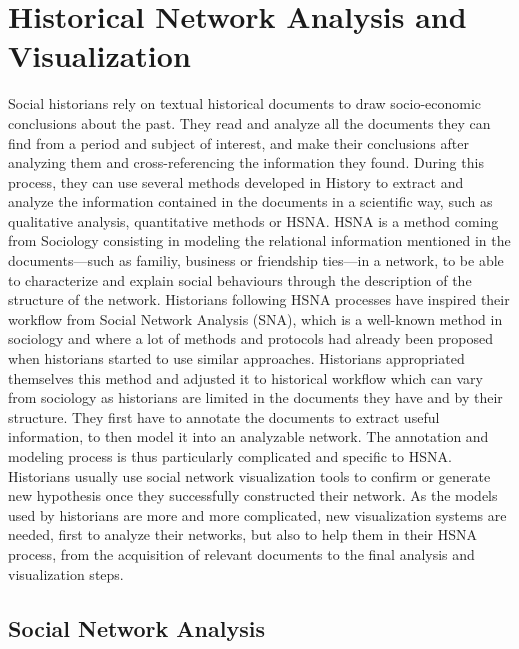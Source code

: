 
\chapter{Historical Network Analysis and Visualization}\label{ch:related-work}

Social historians rely on textual historical documents to draw socio-economic conclusions about the past.
They read and analyze all the documents they can find from a period and subject of interest, and make their conclusions after analyzing them and cross-referencing the information they found.
During this process, they can use several methods developed in History to extract and analyze the information contained in the documents in a scientific way, such as qualitative analysis, quantitative methods or HSNA.
HSNA is a method coming from Sociology consisting in modeling the relational information mentioned in the documents---such as familiy, business or friendship ties---in a network, to be able to characterize and explain social behaviours through the description of the structure of the network.
Historians following HSNA processes have inspired their workflow from Social Network Analysis (SNA), which is a well-known method in sociology and where a lot of methods and protocols had already been proposed when historians started to use similar approaches.
Historians appropriated themselves this method and adjusted it to historical workflow which can vary from sociology as historians are limited in the documents they have and by their structure.
They first have to annotate the documents to extract useful information, to then model it into an analyzable network.
The annotation and modeling process is thus particularly complicated and specific to HSNA.
Historians usually use social network visualization tools to confirm or generate new hypothesis once they successfully constructed their network.
As the models used by historians are more and more complicated, new visualization systems are needed, first to analyze their networks, but also to help them in their HSNA process, from the acquisition of relevant documents to the final analysis and visualization steps.



\section{Social Network Analysis}

